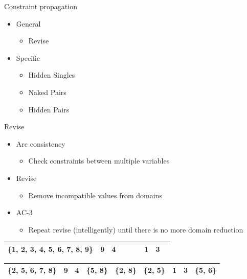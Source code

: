 \documentclass{beamer}
\begin{document}
\begin{frame}{Constraint propagation}

\begin{itemize}
\item General
    \begin{itemize}
    \item Revise
    \end{itemize}
\item Specific
    \begin{itemize}
    \item Hidden Singles
    \item Naked Pairs
    \item Hidden Pairs
    \end{itemize}
\end{itemize}

\end{frame}

\begin{frame}{Revise}

\begin{itemize}
\item Arc consistency
\begin{itemize}
    \item Check constraints between multiple variables
\end{itemize}
\item Revise
\begin{itemize}
    \item Remove incompatible values from domains
\end{itemize}
\item AC-3
\begin{itemize}
    \item Repeat revise (intelligently) until there is no more domain reduction
\end{itemize}
\end{itemize}

\begin{table}[htbp]
    \begin{center}

        \begin{tabular}{|c|c|c|c|c|c|c|c|c|}
        \hline
        \cellcolor[gray]{0.7}\{1, 2, 3, 4, 5, 6, 7, 8, 9\} & 9 & 4 &  &  &  & 1 & 3 & \\
        \hline
        \end{tabular}
    \end{center}
\end{table}

\begin{table}[htbp]
    \begin{center}

        \begin{tabular}{|c|c|c|c|c|c|c|c|c|}
        \hline
        \cellcolor[gray]{0.7}\{2, 5, 6, 7, 8\} & 9 & 4 & \{5, 8\} & \{2, 8\} & \{2, 5\} & 1 & 3 & \{5, 6\}\\
        \hline
        \end{tabular}
    \end{center}
\end{table}

\end{frame}
\end{document}
